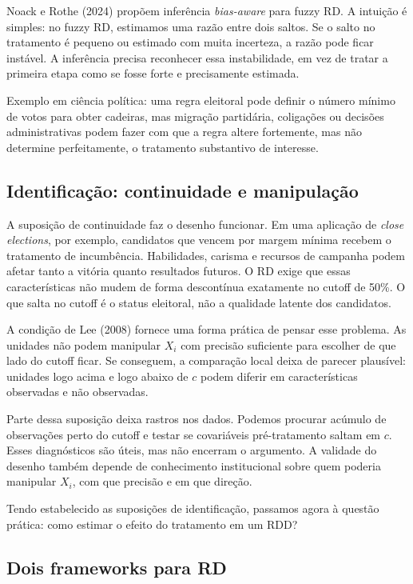\documentclass[
]{article}
\begin{document}
Noack e Rothe (2024) propõem inferência \emph{bias-aware} para fuzzy RD. A intuição é simples: no fuzzy RD, estimamos uma razão entre dois saltos. Se o salto no tratamento é pequeno ou estimado com muita incerteza, a razão pode ficar instável. A inferência precisa reconhecer essa instabilidade, em vez de tratar a primeira etapa como se fosse forte e precisamente estimada.

Exemplo em ciência política: uma regra eleitoral pode definir o número mínimo de votos para obter cadeiras, mas migração partidária, coligações ou decisões administrativas podem fazer com que a regra altere fortemente, mas não determine perfeitamente, o tratamento substantivo de interesse.

\subsection{Identificação: continuidade e manipulação}\label{identificauxe7uxe3o-continuidade-e-manipulauxe7uxe3o}

A suposição de continuidade faz o desenho funcionar. Em uma aplicação de \emph{close elections}, por exemplo, candidatos que vencem por margem mínima recebem o tratamento de incumbência. Habilidades, carisma e recursos de campanha podem afetar tanto a vitória quanto resultados futuros. O RD exige que essas características não mudem de forma descontínua exatamente no cutoff de 50\%. O que salta no cutoff é o status eleitoral, não a qualidade latente dos candidatos.

A condição de Lee (2008) fornece uma forma prática de pensar esse problema. As unidades não podem manipular \(X_i\) com precisão suficiente para escolher de que lado do cutoff ficar. Se conseguem, a comparação local deixa de parecer plausível: unidades logo acima e logo abaixo de \(c\) podem diferir em características observadas e não observadas.

Parte dessa suposição deixa rastros nos dados. Podemos procurar acúmulo de observações perto do cutoff e testar se covariáveis pré-tratamento saltam em \(c\). Esses diagnósticos são úteis, mas não encerram o argumento. A validade do desenho também depende de conhecimento institucional sobre quem poderia manipular \(X_i\), com que precisão e em que direção.

Tendo estabelecido as suposições de identificação, passamos agora à questão prática: como estimar o efeito do tratamento em um RDD?

\subsection{Dois frameworks para RD}\label{dois-frameworks-para-rd}
\end{document}
